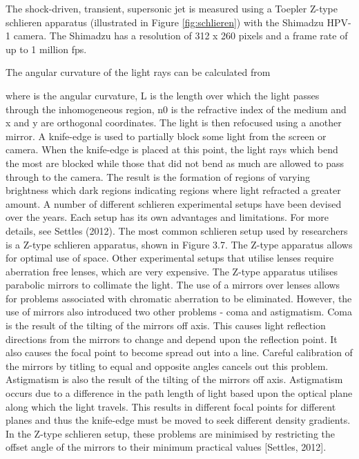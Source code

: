 The shock-driven, transient, supersonic jet is measured using a Toepler Z-type schlieren apparatus \cite{settles2001schlieren} (illustrated in Figure \ref{fig:schlieren}) with the Shimadzu HPV-1 camera. The Shimadzu has a resolution of 312 x 260 pixels and a frame rate of up to 1 million fps. 

 The angular curvature of the light rays can be calculated from

where  is the angular curvature, L is the length over which the light passes through the
inhomogeneous region, n0 is the refractive index of the medium and x and y are orthogonal
coordinates.
The light is then refocused using a another mirror. A knife-edge is used to partially
block some light from the screen or camera. When the knife-edge is placed at this point,
the light rays which bend the most are blocked while those that did not bend as much are
allowed to pass through to the camera. The result is the formation of regions of varying
brightness which dark regions indicating regions where light refracted a greater amount. A
number of different schlieren experimental setups have been devised over the years. Each
setup has its own advantages and limitations. For more details, see Settles (2012).
The most common schlieren setup used by researchers is a Z-type schlieren apparatus,
shown in Figure 3.7. The Z-type apparatus allows for optimal use of space. Other experimental
setups that utilise lenses require aberration free lenses, which are very expensive.
The Z-type apparatus utilises parabolic mirrors to collimate the light. The use of a mirrors
over lenses allows for problems associated with chromatic aberration to be eliminated.
However, the use of mirrors also introduced two other problems - coma and astigmatism.
Coma is the result of the tilting of the mirrors off axis. This causes light reflection directions
from the mirrors to change and depend upon the reflection point. It also causes the
focal point to become spread out into a line. Careful calibration of the mirrors by titling
to equal and opposite angles cancels out this problem. Astigmatism is also the result of
the tilting of the mirrors off axis. Astigmatism occurs due to a difference in the path
length of light based upon the optical plane along which the light travels. This results in
different focal points for different planes and thus the knife-edge must be moved to seek
different density gradients. In the Z-type schlieren setup, these problems are minimised by
restricting the offset angle of the mirrors to their minimum practical values [Settles, 2012].
